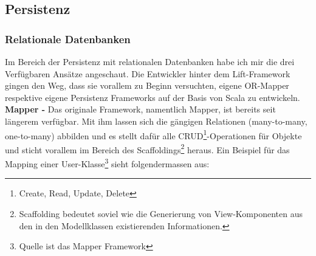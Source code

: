 \subsection{Persistenz}\label{grundlagen:persistenz}
\subsubsection{Relationale Datenbanken}
Im Bereich der Persistenz mit relationalen Datenbanken habe ich mir die drei Verf\"ugbaren Ans\"atze angeschaut. Die Entwickler hinter dem Lift-Framework gingen den Weg, dass sie vorallem zu Beginn versuchten, eigene OR-Mapper respektive eigene Persistenz Frameworks auf der Basis von Scala zu entwickeln. \newline\newline
\textbf{Mapper - }Das originale Framework, namentlich Mapper, ist bereits seit l\"angerem verf\"ugbar. Mit ihm lassen sich die g\"angigen Relationen (many-to-many, one-to-many) abbilden und es stellt daf\"ur alle CRUD\footnote{Create, Read, Update, Delete}-Operationen f\"ur Objekte und sticht vorallem im Bereich des Scaffoldings\footnote{Scaffolding bedeutet soviel wie die Generierung von View-Komponenten aus den in den Modellklassen existierenden Informationen.} heraus. \newline\newline
Ein Beispiel f\"ur das Mapping einer User-Klasse\footnote{Quelle ist das Mapper Framework} sieht folgendermassen aus:

